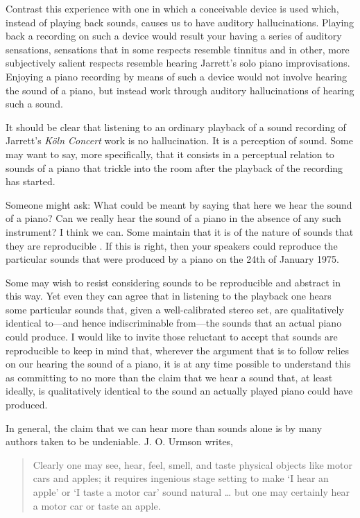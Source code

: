 \documentclass[sloppy, journal, git, anonymise, dodraft]{humapap}
\begin{document}
Contrast this experience with one in which a conceivable device is used
which, instead of playing back sounds, causes us to have auditory
hallucinations. Playing back a recording on such a device would result
your having a series of auditory sensations, sensations that in some
respects resemble tinnitus and in other, more subjectively salient
respects resemble hearing Jarrett's solo piano improvisations. Enjoying
a piano recording by means of such a device would not involve hearing
the sound of a piano, but instead work through auditory hallucinations
of hearing such a sound.

It should be clear that listening to an ordinary playback of a sound
recording of Jarrett's \emph{Köln Concert} work is no hallucination. It
is a perception of sound. Some may want to say, more specifically, that
it consists in a perceptual relation to sounds of a piano that trickle
into the room after the playback of the recording has started.

Someone might ask: What could be meant by saying that here we hear the
sound of a piano? Can we really hear the sound of a piano in the absence
of any such instrument? I think we can. Some maintain that it is of the
nature of sounds that they are reproducible \autocite{martin2012aa}. If
this is right, then your speakers could reproduce the particular sounds
that were produced by a piano on the 24th of January 1975.

Some may wish to resist considering sounds to be reproducible and
abstract in this way. Yet even they can agree that in listening to the
playback one hears some particular sounds that, given a well-calibrated
stereo set, are qualitatively identical to---and hence indiscriminable
from---the sounds that an actual piano could produce. I would like to
invite those reluctant to accept that sounds are reproducible to keep in
mind that, wherever the argument that is to follow relies on our hearing
the sound of a piano, it is at any time possible to understand this as
committing to no more than the claim that we hear a sound that, at least
ideally, is qualitatively identical to the sound an actually played
piano could have produced.



\sect In general, the claim that we can hear more than sounds alone is by many
authors taken to be undeniable. J. O. Urmson writes,

\begin{quote}
Clearly one may see, hear, feel, smell, and taste physical objects like
motor cars and apples; it requires ingenious stage setting to make `I
hear an apple' or `I taste a motor car' sound natural \ldots{} but one
may certainly hear a motor car or taste an
apple.\autocite[p. 117]{urmson1968aa}
\end{quote}
\end{document}

